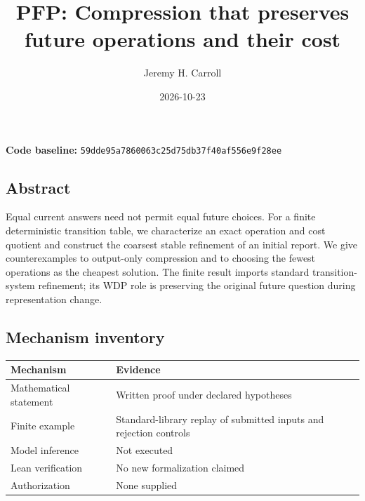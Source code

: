 \documentclass[
  11pt,
]{article}
\title{PFP: Compression that preserves future operations and their cost}
\author{Jeremy H. Carroll}
\date{2026-10-23}
\begin{document}
\makeatletter
\begin{center}
{\LARGE \@title\par}
\vspace{0.8em}
{\normalsize \@author\par}
\vspace{0.5em}
{\small \@date\par}
\end{center}
\makeatother

\textbf{Code baseline:}
\nolinkurl{59dde95a7860063c25d75db37f40af556e9f28ee}

\subsection{Abstract}\label{abstract}

Equal current answers need not permit equal future choices. For a finite
deterministic transition table, we characterize an exact operation and
cost quotient and construct the coarsest stable refinement of an initial
report. We give counterexamples to output-only compression and to
choosing the fewest operations as the cheapest solution. The finite
result imports standard transition-system refinement; its WDP role is
preserving the original future question during representation change.

\subsection{Mechanism inventory}\label{mechanism-inventory}

\begin{longtable}[]{@{}
  >{\raggedright\arraybackslash}p{}
  >{\raggedright\arraybackslash}p{}@{}}
\toprule\noalign{}
\begin{minipage}[b]{\linewidth}\raggedright
Mechanism
\end{minipage} & \begin{minipage}[b]{\linewidth}\raggedright
Evidence
\end{minipage} \\
\midrule\noalign{}
\endhead
\bottomrule\noalign{}
\endlastfoot
Mathematical statement & Written proof under declared hypotheses \\
Finite example & Standard-library replay of submitted inputs and
rejection controls \\
Model inference & Not executed \\
Lean verification & No new formalization claimed \\
Authorization & None supplied \\
\end{longtable}
\end{document}
